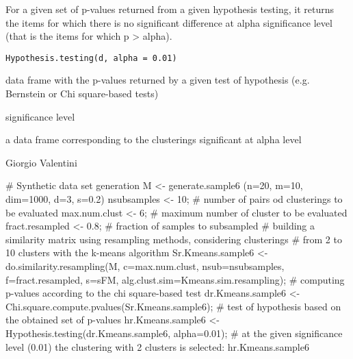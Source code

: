 \documentclass{article}
\begin{document}
\begin{Description}\relax
For a given set of p-values returned from a given hypothesis testing, it returns the items for which there is no significant difference at
alpha significance level (that is the items for which p > alpha).
\end{Description}
\begin{Usage}
\begin{verbatim}
Hypothesis.testing(d, alpha = 0.01)
\end{verbatim}
\end{Usage}
\begin{Arguments}
\begin{ldescription}
\item[\code{d}] data frame with the p-values returned by a given test of hypothesis (e.g. Bernstein or Chi square-based tests) 
\item[\code{alpha}] significance level 
\end{ldescription}
\end{Arguments}
\begin{Value}
a data frame corresponding to the clusterings significant at alpha level
\end{Value}
\begin{Author}\relax
Giorgio Valentini 
\end{Author}
\begin{SeeAlso}\relax
{} 
\end{SeeAlso}
\begin{Examples}
\begin{ExampleCode}
# Synthetic data set generation
M <- generate.sample6 (n=20, m=10, dim=1000, d=3, s=0.2)
nsubsamples <- 10;  # number of pairs od clusterings to be evaluated
max.num.clust <- 6; # maximum number of cluster to be evaluated
fract.resampled <- 0.8; # fraction of samples to subsampled
# building a similarity matrix using resampling methods, considering clusterings 
# from 2 to 10 clusters with the k-means algorithm
Sr.Kmeans.sample6 <- do.similarity.resampling(M, c=max.num.clust, nsub=nsubsamples, 
                     f=fract.resampled, s=sFM, alg.clust.sim=Kmeans.sim.resampling);
# computing p-values according to the chi square-based test
dr.Kmeans.sample6 <- Chi.square.compute.pvalues(Sr.Kmeans.sample6);
# test of hypothesis based on the obtained set of p-values
hr.Kmeans.sample6 <- Hypothesis.testing(dr.Kmeans.sample6, alpha=0.01);
# at the given significance level (0.01) the clustering with 2 clusters is selected:
hr.Kmeans.sample6
\end{ExampleCode}
\end{Examples}
\end{document}
